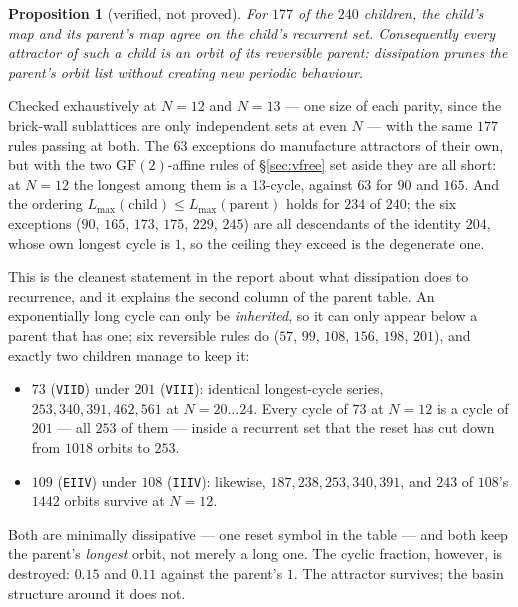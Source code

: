 \documentclass[11pt]{article}
\newcommand{\rt}[1]{\texttt{#1}}
\theoremstyle{plain}
\newtheorem{proposition}{Proposition}
\theoremstyle{definition}
\begin{document}
\begin{proposition}[verified, not proved]
For $177$ of the $240$ children, the child's map and its parent's map agree on
the child's recurrent set. Consequently every attractor of such a child is an
orbit of its reversible parent: dissipation \emph{prunes} the parent's orbit list
without creating new periodic behaviour.
\end{proposition}

\noindent Checked exhaustively at $N=12$ and $N=13$ --- one size of each parity,
since the brick-wall sublattices are only independent sets at even $N$ --- with
the same $177$ rules passing at both. The $63$ exceptions do manufacture
attractors of their own, but with the two $\mathrm{GF}(2)$-affine rules of
\S\ref{sec:vfree} set aside they are all short: at $N=12$ the longest among them
is a $13$-cycle, against $63$ for $90$ and $165$. And the ordering
$L_{\max}(\text{child}) \le
L_{\max}(\text{parent})$ holds for $234$ of $240$; the six exceptions
($90$, $165$, $173$, $175$, $229$, $245$) are all descendants of the identity
$204$, whose own longest cycle is $1$, so the ceiling they exceed is the
degenerate one.

This is the cleanest statement in the report about what dissipation does to
recurrence, and it explains the second column of the parent table. An
exponentially long cycle can only be \emph{inherited}, so it can only appear
below a parent that has one; six reversible rules do ($57$, $99$, $108$, $156$,
$198$, $201$), and exactly two children manage to keep it:

\begin{itemize}
\item $73$ (\rt{VIID}) under $201$ (\rt{VIII}): identical longest-cycle series,
  $253,340,391,462,561$ at $N=20\ldots24$. Every cycle of $73$ at $N=12$ is a
  cycle of $201$ --- all $253$ of them --- inside a recurrent set that the reset
  has cut down from $1018$ orbits to $253$.
\item $109$ (\rt{EIIV}) under $108$ (\rt{IIIV}): likewise, $187,238,253,340,391$,
  and $243$ of $108$'s $1442$ orbits survive at $N=12$.
\end{itemize}

\noindent Both are minimally dissipative --- one reset symbol in the table --- and
both keep the parent's \emph{longest} orbit, not merely a long one. The cyclic
fraction, however, is destroyed: $0.15$ and $0.11$ against the parent's $1$.
The attractor survives; the basin structure around it does not.
\end{document}
